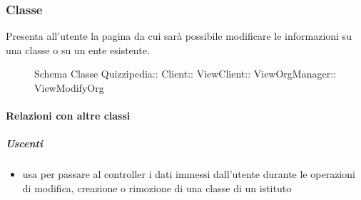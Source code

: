 \subsubsection{Classe }
Presenta all'utente la pagina da cui sarà possibile modificare le informazioni su una classe o su un ente esistente.
\begin{figure}[H]
\centering
\noindent{}
\caption[Schema Classe ViewModifyOrg]{Schema Classe Quizzipedia:: Client:: ViewClient:: ViewOrgManager:: ViewModifyOrg}
\end{figure}
\paragraph{Relazioni con altre classi}
\subparagraph{Uscenti}
\begin{itemize}
\item usa  per passare al controller i dati immessi dall'utente durante le operazioni di modifica, creazione o rimozione di una classe di un istituto
\end{itemize}
